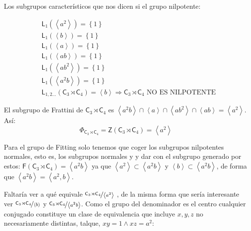 \documentclass[12pt,a4paper,fleqn,spanish,final,openright]{extbook}
\theoremstyle{definition}
\theoremstyle{remark}
\begin{document}
Los subgrupos característicos que nos dicen si el grupo nilpotente:

\begin{align*}
&\mathsf{L}_{1}\left({\left\langle{a^2}\right\rangle}\right) 
= 
{\left\lbrace{1}\right\rbrace}\\
&\mathsf{L}_{1}\left({\left\langle{b}\right\rangle}\right) 
= 
{\left\lbrace{1}\right\rbrace}\\
&\mathsf{L}_{1}\left({\left\langle{a}\right\rangle}\right) 
= 
{\left\lbrace{1}\right\rbrace}\\
&\mathsf{L}_{1}\left({\left\langle{ab}\right\rangle}\right) 
= 
{\left\lbrace{1}\right\rbrace}\\
&\mathsf{L}_{1}\left({\left\langle{ab^2}\right\rangle}\right) 
= 
{\left\lbrace{1}\right\rbrace}\\
&\mathsf{L}_{1}\left({\left\langle{a^2b}\right\rangle}\right) 
= 
{\left\lbrace{1}\right\rbrace}\\
&{\mathsf{L}}_{1,2 ...}
\left(
{{{\mathsf{C}}_{3}}\rtimes{{\mathsf{C}}_{4}}}
\right) 
= 
{\left\langle{b}\right\rangle} \Rightarrow 
{{{\mathsf{C}}_{3}}\rtimes{{\mathsf{C}}_{4}}} 
\mbox{ NO ES NILPOTENTE}
\end{align*}

El subgrupo de Frattini de ${{\mathsf{C}}_{3}}\rtimes{{\mathsf{C}}_{4}}$ es 
$
\left\langle{ a^2 b}\right\rangle 
\cap 
\left\langle{a}\right\rangle 
\cap 
\left\langle{a b^2}\right\rangle
\cap
\left\langle{a b}\right\rangle
= 
{
\left\langle
{a^2}
\right\rangle
}$. 
Así: 
\[
{\Phi}_{{{{\mathsf{C}}_{3}}\rtimes{{\mathsf{C}}_{4}}}} = 
{\mathsf{Z}}{\left({{{\mathsf{C}}_{3}}\rtimes{{\mathsf{C}}_{4}}}\right)}=
{\left\langle{a^2}\right\rangle}
\]

Para el grupo de Fitting solo tenemos que coger los subgrupos nilpotentes normales, esto es, 
los subgrupos normales y y dar con el subgrupo generado por estos: ${\mathsf{F}}
{\left({{{\mathsf{C}}_{3}}\rtimes{{\mathsf{C}}_{4}}}\right)}=
{\left\langle{a^2 b}\right\rangle}$ ya que 
${\left\langle{a^2}\right\rangle}\subset{\left\langle{a^2 b}\right\rangle}$ 
y ${\left\langle{b}\right\rangle}\subset{\left\langle{a^2 b}\right\rangle}$, 
de forma que ${\left\langle{a^2 b}\right\rangle}={\left\langle{a^2 , b}\right\rangle}$.


Faltaría ver a qué equivale 
$\nicefrac{{{{\mathsf{C}}_{3}}\rtimes{{\mathsf{C}}_{4}}}}{\left\langle{a^2}\right\rangle}$
, de la misma forma que sería interesante ver 
$\nicefrac{{{{\mathsf{C}}_{3}}\rtimes{{\mathsf{C}}_{4}}}}{\left\langle{b}\right\rangle}$
y $\nicefrac{{{{\mathsf{C}}_{3}}\rtimes{{\mathsf{C}}_{4}}}}{\left\langle{a^2 b}\right\rangle}$.
Como el grupo del denominador es el centro cualquier conjugado constituye un clase de 
equivalencia que incluye $x,y,z$ no necesariamente distintas, talque, $xy=1 \wedge xz=a^2$:
\end{document}
